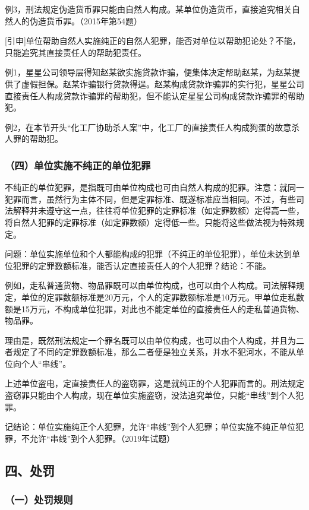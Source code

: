 例3，刑法规定伪造货币罪只能由自然人构成。某单位伪造货币，直接追究相关自然人的伪造货币罪。（2015年第54题）

[引申]单位帮助自然人实施纯正的自然人犯罪，能否对单位以帮助犯论处？不能，只能追究其直接责任人的帮助犯责任。

例1，星星公司领导层得知赵某欲实施贷款诈骗，便集体决定帮助赵某，为赵某提供了虚假担保。赵某诈骗银行贷款得逞。赵某构成贷款诈骗罪的实行犯，星星公司直接责任人构成贷款诈骗罪的帮助犯，但不能认定星星公司构成贷款诈骗罪的帮助犯。

例2，在本节开头“化工厂协助杀人案”中，化工厂的直接责任人构成狗蛋的故意杀人罪的帮助犯。

\subsubsection*{（四）单位实施不纯正的单位犯罪}

不纯正的单位犯罪，是指既可由单位构成也可由自然人构成的犯罪。注意：就同一犯罪而言，虽然行为主体不同，但是定罪标准、既遂标准应当相同。不过，有些司法解释并未遵守这一点，往往将单位犯罪的定罪标准（如定罪数额）定得高一些，将自然人犯罪的定罪标准（如定罪数额）定得低一些。只能将这些做法视为特殊规定。

问题：单位实施单位和个人都能构成的犯罪（不纯正的单位犯罪），单位未达到单位犯罪的定罪数额标准，能否认定直接责任人的个人犯罪？结论：不能。

例如，走私普通货物、物品罪既可以由单位构成，也可以由个人构成。司法解释规定，单位的定罪数额标准是20万元，个人的定罪数额标准是10万元。甲单位走私数额是15万元，不构成单位犯罪，对此也不能定单位的直接责任人的走私普通货物、物品罪。

理由是，既然刑法规定一个罪名既可以由单位构成，也可以由个人构成，并且为二者规定了不同的定罪数额标准，那么二者便是独立关系，并水不犯河水，不能从单位向个人“串线”。

上述单位盗电，定直接责任人的盗窃罪，这是就纯正的个人犯罪而言的。刑法规定盗窃罪只能由个人构成，现在单位实施盗窃，没法追究单位，只能“串线”到个人犯罪。

记结论：单位实施纯正个人犯罪，允许“串线”到个人犯罪；单位实施不纯正单位犯罪，不允许“串线”到个人犯罪。（2019年试题）

\subsection*{四、处罚}

\subsubsection*{（一）处罚规则}


